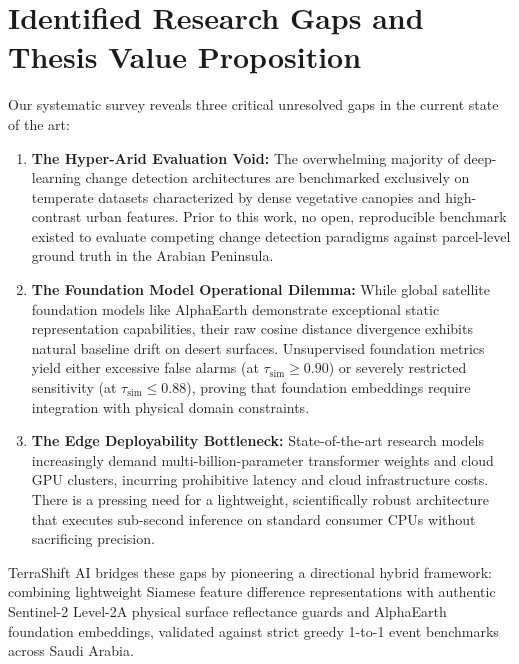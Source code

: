 \section{Identified Research Gaps and Thesis Value Proposition}
\label{sec:lit_gaps}
Our systematic survey reveals three critical unresolved gaps in the current state of the art:

\begin{enumerate}
    \item \textbf{The Hyper-Arid Evaluation Void:} The overwhelming majority of deep-learning change detection architectures are benchmarked exclusively on temperate datasets characterized by dense vegetative canopies and high-contrast urban features. Prior to this work, no open, reproducible benchmark existed to evaluate competing change detection paradigms against parcel-level ground truth in the Arabian Peninsula.
    \item \textbf{The Foundation Model Operational Dilemma:} While global satellite foundation models like AlphaEarth demonstrate exceptional static representation capabilities, their raw cosine distance divergence exhibits natural baseline drift on desert surfaces. Unsupervised foundation metrics yield either excessive false alarms (at $\tau_{\text{sim}} \ge 0.90$) or severely restricted sensitivity (at $\tau_{\text{sim}} \le 0.88$), proving that foundation embeddings require integration with physical domain constraints.
    \item \textbf{The Edge Deployability Bottleneck:} State-of-the-art research models increasingly demand multi-billion-parameter transformer weights and cloud GPU clusters, incurring prohibitive latency and cloud infrastructure costs. There is a pressing need for a lightweight, scientifically robust architecture that executes sub-second inference on standard consumer CPUs without sacrificing precision.
\end{enumerate}

TerraShift AI bridges these gaps by pioneering a directional hybrid framework: combining lightweight Siamese feature difference representations with authentic Sentinel-2 Level-2A physical surface reflectance guards and AlphaEarth foundation embeddings, validated against strict greedy 1-to-1 event benchmarks across Saudi Arabia.
\newpage

